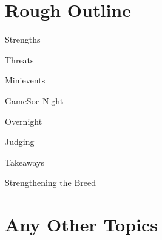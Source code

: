 \documentclass[11pt,hacksoc,agenda]{meetingmins}
\begin{document}
\maketitle

\section{Rough Outline}
\begin{items}
\item Strengths
\item Threats
\item Minievents
\item GameSoc Night
\item Overnight
\item Judging
\item Takeaways
\item Strengthening the Breed
\end{items}



\section{Any Other Topics}

\vspace{1em}
\end{document}
